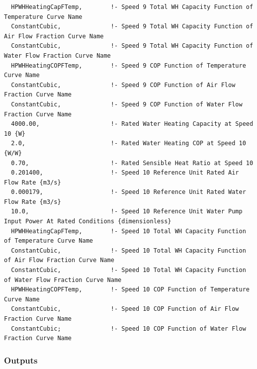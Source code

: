 \begin{lstlisting}
  HPWHHeatingCapFTemp,        !- Speed 9 Total WH Capacity Function of Temperature Curve Name
  ConstantCubic,              !- Speed 9 Total WH Capacity Function of Air Flow Fraction Curve Name
  ConstantCubic,              !- Speed 9 Total WH Capacity Function of Water Flow Fraction Curve Name
  HPWHHeatingCOPFTemp,        !- Speed 9 COP Function of Temperature Curve Name
  ConstantCubic,              !- Speed 9 COP Function of Air Flow Fraction Curve Name
  ConstantCubic,              !- Speed 9 COP Function of Water Flow Fraction Curve Name
  4000.00,                    !- Rated Water Heating Capacity at Speed 10 {W}
  2.0,                        !- Rated Water Heating COP at Speed 10 {W/W}
  0.70,                       !- Rated Sensible Heat Ratio at Speed 10
  0.201400,                   !- Speed 10 Reference Unit Rated Air Flow Rate {m3/s}
  0.000179,                   !- Speed 10 Reference Unit Rated Water Flow Rate {m3/s}
  10.0,                       !- Speed 10 Reference Unit Water Pump Input Power At Rated Conditions {dimensionless}
  HPWHHeatingCapFTemp,        !- Speed 10 Total WH Capacity Function of Temperature Curve Name
  ConstantCubic,              !- Speed 10 Total WH Capacity Function of Air Flow Fraction Curve Name
  ConstantCubic,              !- Speed 10 Total WH Capacity Function of Water Flow Fraction Curve Name
  HPWHHeatingCOPFTemp,        !- Speed 10 COP Function of Temperature Curve Name
  ConstantCubic,              !- Speed 10 COP Function of Air Flow Fraction Curve Name
  ConstantCubic;              !- Speed 10 COP Function of Water Flow Fraction Curve Name
\end{lstlisting}


\subsubsection{Outputs}\label{vshpwhheating-outputs}

